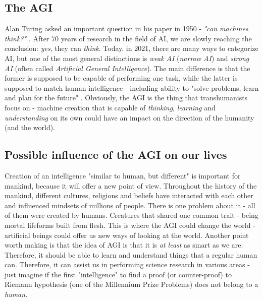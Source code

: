 \documentclass[12pt]{article}
\begin{document}
\subsection{The AGI}
	Alan Turing asked an important question in his paper in 1950 - \emph{"can machines think?"} \cite{turing}. After 70 years of research in the field of AI, we are slowly reaching the conclusion: \emph{yes}, they can \emph{think}. Today, in 2021, there are many ways to categorize AI, but one of the most general distinctions is \emph{weak AI} (\emph{narrow AI}) and \emph{strong AI} (often called \emph{Artificial General Intelligence}). The main difference is that the former is supposed to be capable of performing one task, while the latter is supposed to match human intelligence - including ability to "solve problems, learn and plan for the future" \cite{agi:1}. Obviously, the AGI is the thing that transhumanists focus on - machine creation that is capable of \emph{thinking}, \emph{learning} and \emph{understanding} on its own could have an impact on the direction of the humanity (and the world).

\subsection{Possible influence of the AGI on our lives}
	Creation of an intelligence "similar to human, but different" is important for mankind, because it will offer a new point of view. Throughout the history of the mankind, different cultures, religions and beliefs have interacted with each other and influenced mindsets of millions of people. There is one problem about it - all of them were created by humans. Creatures that shared one common trait - being mortal lifeforms built from flesh. This is where the AGI could change the world - artificial beings could offer us new ways of looking at the world. Another point worth making is that the idea of AGI is that it is \emph{at least} as smart as we are. Therefore, it should be able to learn and understand things that a regular human can. Therefore, it can assist us in performing science research in various areas - just imagine if the first "intelligence" to find a proof (or counter-proof) to Riemann hypothesis (one of the Millennium Prize Problems) does not belong to a \emph{human}.
\end{document}
